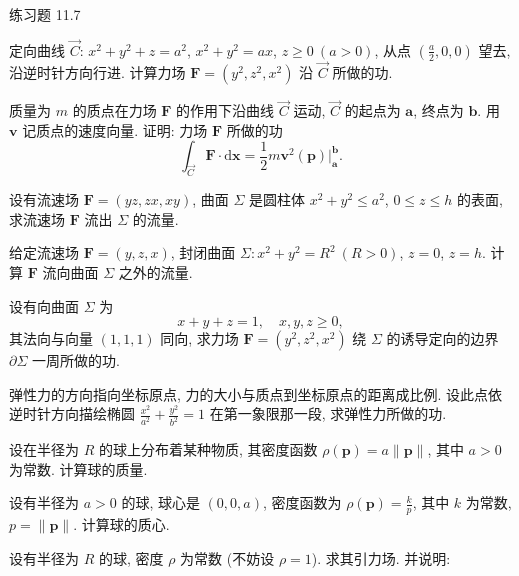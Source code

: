 \begin{exblock}{练习题 11.7}
\item 定向曲线 $\overrightarrow{C}$: $x^{2}+y^{2}+z=a^{2}$, $x^{2}+y^{2}=ax$, $z\geqslant0\ (a>0)$, 从点 $\left(\frac{a}{2},0,0\right)$ 望去, 沿逆时针方向行进. 计算力场 $\boldsymbol{F}=(y^{2},z^{2},x^{2})$ 沿 $\overrightarrow{C}$ 所做的功.

\item 质量为 $m$ 的质点在力场 $\boldsymbol{F}$ 的作用下沿曲线 $\overrightarrow{C}$ 运动, $\overrightarrow{C}$ 的起点为 $\boldsymbol{a}$, 终点为 $\boldsymbol{b}$. 用 $\boldsymbol{v}$ 记质点的速度向量. 证明: 力场 $\boldsymbol{F}$ 所做的功
\[
\int_{\overrightarrow{C}}\boldsymbol{F}\cdot\mathrm{d}\boldsymbol{x}=\frac{1}{2}m\boldsymbol{v}^{2}(\boldsymbol{p})\Big|_{\boldsymbol{a}}^{\boldsymbol{b}}.
\]

\item 设有流速场 $\boldsymbol{F}=(yz,zx,xy)$, 曲面 $\Sigma$ 是圆柱体 $x^{2}+y^{2}\leqslant a^{2}$, $0\leqslant z\leqslant h$ 的表面, 求流速场 $\boldsymbol{F}$ 流出 $\Sigma$ 的流量.

\item 给定流速场 $\boldsymbol{F}=(y,z,x)$, 封闭曲面 $\Sigma:x^{2}+y^{2}=R^{2}\ (R>0)$, $z=0$, $z=h$. 计算 $\boldsymbol{F}$ 流向曲面 $\Sigma$ 之外的流量.

\item 设有向曲面 $\Sigma$ 为
\[
x+y+z=1,\quad x,y,z\geqslant0,
\]
其法向与向量 $(1,1,1)$ 同向, 求力场 $\boldsymbol{F}=(y^{2},z^{2},x^{2})$ 绕 $\Sigma$ 的诱导定向的边界 $\partial\Sigma$ 一周所做的功.

\item 弹性力的方向指向坐标原点, 力的大小与质点到坐标原点的距离成比例. 设此点依逆时针方向描绘椭圆 $\frac{x^{2}}{a^{2}}+\frac{y^{2}}{b^{2}}=1$ 在第一象限那一段, 求弹性力所做的功.

\item 设在半径为 $R$ 的球上分布着某种物质, 其密度函数 $\rho(\boldsymbol{p})=a\|\boldsymbol{p}\|$, 其中 $a>0$ 为常数. 计算球的质量.

\item 设有半径为 $a>0$ 的球, 球心是 $(0,0,a)$, 密度函数为 $\rho(\boldsymbol{p})=\frac{k}{p}$, 其中 $k$ 为常数, $p=\|\boldsymbol{p}\|$. 计算球的质心.

\item 设有半径为 $R$ 的球, 密度 $\rho$ 为常数 (不妨设 $\rho=1$). 求其引力场. 并说明:

  \begin{enumerate}[label=(\arabic*),leftmargin=2.6em,itemsep=0.15\baselineskip,topsep=0.2\baselineskip]


\end{enumerate}
\end{exblock}
